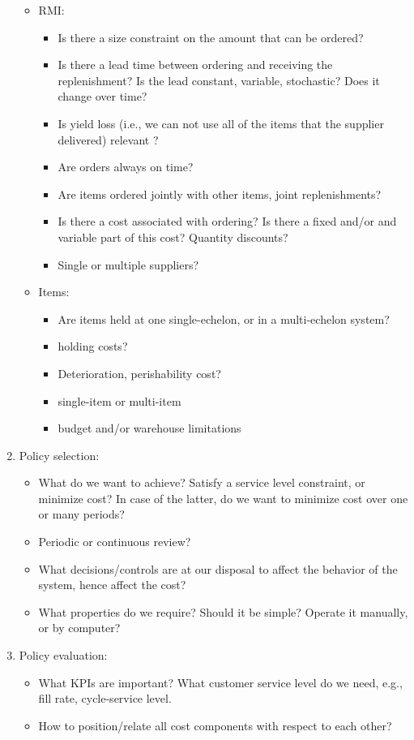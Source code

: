 \begin{question}
\begin{solution}
\begin{enumerate}
\begin{itemize}
    \item RMI:
      \begin{itemize}
      \item Is there a size constraint on the amount that can be ordered? 
      \item Is there a lead time between ordering and receiving the
        replenishment? Is the lead constant, variable, stochastic?
        Does it change over time?
      \item Is yield loss (i.e., we can not use all of the items that
        the supplier delivered) relevant ?
      \item Are orders always on time?
      \item Are items ordered jointly with other items, joint
        replenishments?
      \item Is there a cost associated with ordering? Is there a fixed
        and/or and variable part of this cost? Quantity discounts?
      \item Single or multiple suppliers?
      \end{itemize}
    \item Items:
      \begin{itemize}
      \item Are items held at one single-echelon, or in a
        multi-echelon system?
      \item holding costs?
      \item Deterioration,  perishability cost? 
      \item single-item or  multi-item
      \item budget and/or warehouse limitations
 \end{itemize}
      \end{itemize}
    \item Policy selection:
      \begin{itemize}
      \item What do we want to achieve? Satisfy a service level
        constraint, or minimize cost? In case of the latter, do we
        want to minimize cost over one or many periods?
      \item Periodic or continuous review?
      \item What decisions/controls are at our disposal to affect the
        behavior of the system, hence affect the cost?
      \item What properties do we require? Should it be simple?
        Operate it manually, or by computer? 
      \end{itemize}
    \item Policy evaluation:
      \begin{itemize}
      \item What KPIs are important? What customer service level do we
        need, e.g., fill rate, cycle-service level.
      \item How to position/relate all cost components with respect to
        each other?
      \end{itemize}
    \end{enumerate}
  \end{solution}




\end{question}
